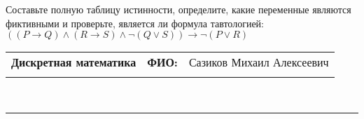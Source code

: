 \documentclass[10pt]{exam}
\newcommand{\class}{Дискретная математика}
\newcommand{\examdate}{}
\begin{document}
\begin{questions}
\begin{enumerate}[a)]
\end{enumerate}\question Составьте полную таблицу истинности, определите, какие переменные являются фиктивными и проверьте, является ли формула тавтологией:
$((P \rightarrow Q) \land (R \rightarrow S) \land \neg (Q \lor S)) \rightarrow \neg (P \lor R)$

\end{questions}
\newpage
\begin{flushright}
\begin{tabular}{p{2.8in} r l}
\textbf{\class} & \textbf{ФИО:} &Сазиков Михаил Алексеевич
\\

\textbf{\examdate} &&\\
\end{tabular}\\
\end{flushright}
\rule[1ex]{\textwidth}{.1pt}
\end{document}
